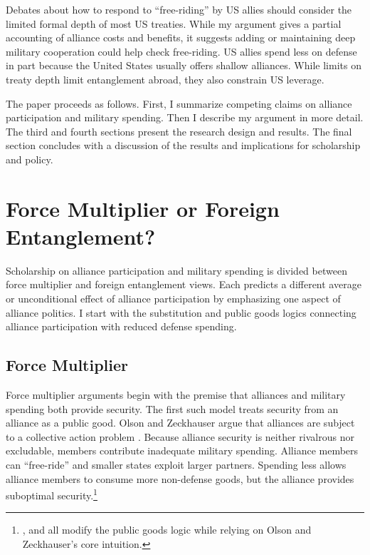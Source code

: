 \documentclass[12pt]{article}
\begin{document}
Debates about how to respond to ``free-riding'' by US allies should consider the limited formal depth of most US treaties.
While my argument gives a partial accounting of alliance costs and benefits, it suggests adding or maintaining deep military cooperation could help check free-riding.   
US allies spend less on defense in part because the United States usually offers shallow alliances. 
While limits on treaty depth limit entanglement abroad, they also constrain US leverage. 


The paper proceeds as follows. 
First, I summarize competing claims on alliance participation and military spending. 
Then I describe my argument in more detail. 
The third and fourth sections present the research design and results. 
The final section concludes with a discussion of the results and implications for scholarship and policy.  



\section{Force Multiplier or Foreign Entanglement?}


Scholarship on alliance participation and military spending is divided between force multiplier and foreign entanglement views.
Each predicts a different average or unconditional effect of alliance participation by emphasizing one aspect of alliance politics.  
I start with the substitution and public goods logics connecting alliance participation with reduced defense spending. 


\subsection{Force Multiplier} 


Force multiplier arguments begin with the premise that alliances and military spending both provide security.
The first such model treats security from an alliance as a public good. 
Olson and Zeckhauser argue that alliances are subject to a collective action problem \citep{OlsonZeckhauser1966}.
Because alliance security is neither rivalrous nor excludable, members contribute inadequate military spending. 
Alliance members can ``free-ride'' and smaller states exploit larger partners. 
Spending less allows alliance members to consume more non-defense goods, but the alliance provides suboptimal security.\footnote{\citet{SandlerForbes1980}, \citet{Oneal1990} and \citet{SandlerHartley2001} all modify the public goods logic while relying on Olson and Zeckhauser's core intuition.} 
\end{document}
